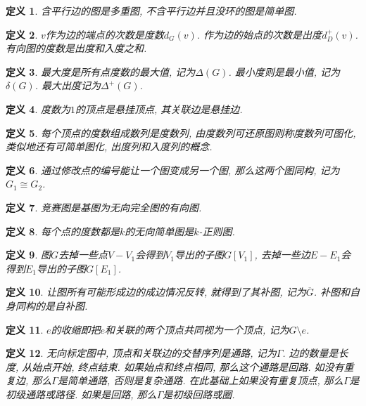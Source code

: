 \documentclass[UTF8,a4paper,11pt]{ctexart}
\newtheorem{definition}{定义}
\begin{document}
    \begin{definition}
      含平行边的图是多重图, 不含平行边并且没环的图是简单图.
    \end{definition}
    \begin{definition}
      $v$作为边的端点的次数是度数$d_G\left(v\right)$.
      作为边的始点的次数是出度$d^{+}_D\left(v\right)$.
      有向图的度数是出度和入度之和.
    \end{definition}
    \begin{definition}
      最大度是所有点度数的最大值, 记为$\Delta\left(G\right)$.
      最小度则是最小值, 记为$\delta\left(G\right)$.
      最大出度记为$\Delta^{+}\left(G\right)$.
    \end{definition}
    \begin{definition}
      度数为$1$的顶点是悬挂顶点, 其关联边是悬挂边.
    \end{definition}
    \begin{definition}
      每个顶点的度数组成数列是度数列,
      由度数列可还原图则称度数列可图化,
      类似地还有可简单图化, 出度列和入度列的概念.
    \end{definition}
    \begin{definition}
      通过修改点的编号能让一个图变成另一个图,
      那么这两个图同构, 记为$G_1 \cong G_2$.
    \end{definition}
    \begin{definition}
      竞赛图是基图为无向完全图的有向图.
    \end{definition}
    \begin{definition}
      每个点的度数都是$k$的无向简单图是$k$-正则图.
    \end{definition}
    \begin{definition}
      图$G$去掉一些点$V-V_1$会得到$V_1$导出的子图$G[V_1]$,
      去掉一些边$E-E_1$会得到$E_1$导出的子图$G[E_1]$.
    \end{definition}
    \begin{definition}
      让图所有可能形成边的成边情况反转, 就得到了其补图, 记为$\overline{G}$.
      补图和自身同构的是自补图.
    \end{definition}
    \begin{definition}
      $e$的收缩即把$e$和关联的两个顶点共同视为一个顶点, 记为$G\setminus e$.
    \end{definition}
    \begin{definition}
      无向标定图中, 顶点和关联边的交替序列是通路, 记为$\Gamma$.
      边的数量是长度, 从始点开始, 终点结束.
      如果始点和终点相同, 那么这个通路是回路.
      如没有重复边, 那么$\Gamma$是简单通路, 否则是复杂通路.
      在此基础上如果没有重复顶点, 那么$\Gamma$是初级通路或路径.
      如果是回路, 那么$\Gamma$是初级回路或圈.
    \end{definition}
\end{document}
